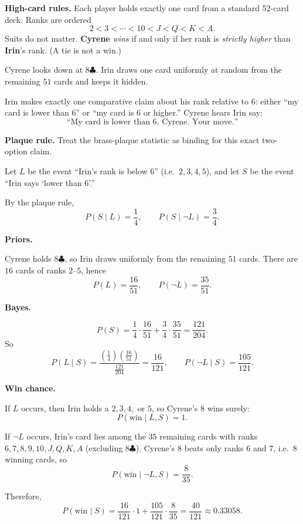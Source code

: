 \Problem

\textbf{High-card rules.} Each player holds exactly one card from a standard 52-card deck. Ranks are ordered
\[
2<3<\cdots<10<J<Q<K<A.
\]
Suits do not matter. \textbf{Cyrene} \emph{wins} if and only if her rank is \emph{strictly higher} than \textbf{Irin}'s rank. (A tie is not a win.)

\medskip

Cyrene looks down at \(8\clubsuit\). Irin draws one card uniformly at random from the remaining \(51\) cards and keeps it hidden.

\medskip

Irin makes exactly one comparative claim about his rank relative to \(6\): either ``my card is lower than \(6\)'' or ``my card is \(6\) or higher.'' Cyrene hears Irin say:
\[
\text{``My card is lower than \(6\), Cyrene. Your move.''}
\]

\medskip

\textbf{Plaque rule.} Treat the brass-plaque statistic as binding for this exact two-option claim.


\SolutionPage

Let \(L\) be the event ``Irin's rank is below \(6\)'' (i.e.\ \(2,3,4,5\)), and let \(S\) be the event ``Irin says `lower than \(6\)'.''

By the plaque rule,
\[
P(S\mid L)=\frac14,\qquad P(S\mid \neg L)=\frac34.
\]

\medskip

\textbf{Priors.}

Cyrene  holds \(8\clubsuit\), so Irin draws uniformly from the remaining \(51\) cards. There are \(16\) cards of ranks \(2\)–\(5\), hence
\[
P(L)=\frac{16}{51},\qquad P(\neg L)=\frac{35}{51}.
\]

\medskip

\textbf{Bayes.}

\[
P(S)=\frac14\cdot\frac{16}{51}+\frac34\cdot\frac{35}{51}=\frac{121}{204}.
\]
So
\[
P(L\mid S)=\frac{(\frac14)(\frac{16}{51})}{\frac{121}{204}}=\frac{16}{121},
\qquad
P(\neg L\mid S)=\frac{105}{121}.
\]

\medskip

\textbf{Win chance.}

If \(L\) occurs, then Irin holds a \(2,3,4,\) or \(5\), so Cyrene's \(8\) wins surely:
\[
P(\text{win}\mid L,S)=1.
\]

If \(\neg L\) occurs, Irin's card lies among the \(35\) remaining cards with ranks \(6,7,8,9,10,J,Q,K,A\) (excluding \(8\clubsuit\)).
Cyrene's \(8\) beats only ranks \(6\) and \(7\), i.e.\ \(8\) winning cards, so
\[
P(\text{win}\mid \neg L,S)=\frac{8}{35}.
\]

Therefore,
\[
P(\text{win}\mid S)=\frac{16}{121}\cdot 1+\frac{105}{121}\cdot\frac{8}{35}
=\frac{40}{121}\approx 0.33058.
\]


\NextPage
